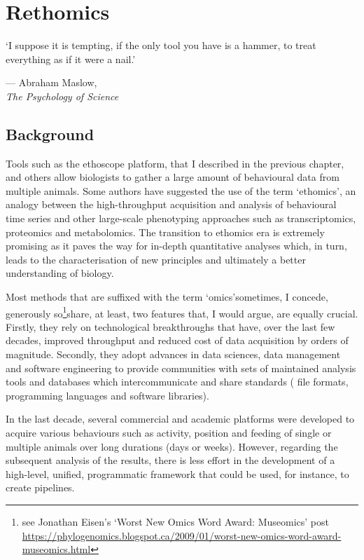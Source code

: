 \edef\figdir{\currfiledir/fig}

\chapter{Rethomics} \label{rethomics}

\epigraph{`I suppose it is tempting, if the only tool you have is a hammer, to treat everything as if it were a nail.'}{--- Abraham Maslow,\\
	\emph{The Psychology of Science}~\cite[p.~15]{maslow_psychology_1966}}
\section{Background}


Tools such as the ethoscope platform, that I described in the previous chapter, and others allow biologists to gather a large amount of behavioural data from multiple animals.
Some authors have suggested the use of the term `ethomics', an analogy between the high-throughput acquisition and analysis of behavioural time series and other large-scale phenotyping approaches such as transcriptomics, proteomics and metabolomics\cite{reiser_ethomics_2009}.
The transition to ethomics era is extremely promising as it paves the way for in-depth quantitative analyses which, in turn, leads to the characterisation of new principles and ultimately a better understanding of biology\cite{brown_study_2017}.

Most methods that are suffixed with the term `omics'\emd{}sometimes, I concede, generously so\footnote{see Jonathan Eisen's `Worst New Omics Word Award: Museomics' post\\  \url{https://phylogenomics.blogspot.ca/2009/01/worst-new-omics-word-award-museomics.html}}\emd{}share, at least, two features that, I would argue, are equally crucial. 
Firstly, they rely on technological breakthroughs that have, over the last few decades, improved throughput and reduced cost of data acquisition by orders of magnitude. 
Secondly, they adopt advances in data sciences, data management and software engineering to provide communities with sets of maintained analysis tools and databases which intercommunicate and share standards (\eg{} file formats, programming languages and software libraries).

In the last decade, several commercial and academic platforms were developed to acquire  various behaviours such as activity\cite{faville_how_2015}, position\cite{pelkowski_novel_2011} and feeding\cite{itskov_automated_2014,ro_flic_2014} of single or multiple\cite{swierczek_high-throughput_2011,perez-escudero_idtracker_2014} animals over long durations (days or weeks).
However, regarding the subsequent analysis of the results, there is less effort in the development of a high-level, unified, programmatic framework that could be used, for instance, to create pipelines.

